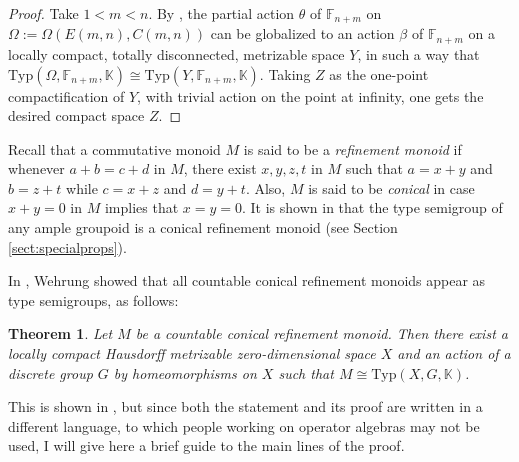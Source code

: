 \documentclass[11pt]{amsart}
\theoremstyle{plain}            %
\newtheorem{theorem}{Theorem}[section]
\theoremstyle{definition}       %
\theoremstyle{definition}       %
\theoremstyle{remark}
\newcommand{\Typ}{\mathrm{Typ}}
\begin{document}
\begin{proof}
Take $1<m<n$. By \cite[Corollary 7.9]{ae14}, the partial action $\theta$ of $\mathbb F_{n+m}$ on $\Omega:= \Omega (E(m,n),C(m,n))$ can be globalized to an action $\beta$ of $\mathbb F_{n+m}$
on a locally compact, totally disconnected, metrizable space $Y$, in such a way that $\Typ (\Omega, \mathbb F_{n+m},\mathbb K) \cong \Typ (Y, \mathbb F_{n+m},\mathbb K)$.
Taking $Z$ as the one-point compactification of $Y$, with trivial action on the point at infinity, one gets the desired compact space $Z$.
\end{proof}

Recall that a commutative monoid $M$ is said to be a {\it refinement monoid} if whenever $a+b=c+d$ in $M$, there exist $x,y,z,t$ in $M$ such that $a=x+y$ and $b=z+t$ while $c= x+z$ and $d= y+t$. 
Also, $M$ is said to be {\it conical} in case $x+y=0$ in $M$ implies that $x=y=0$. It is shown in \cite{weh} that the type semigroup of any ample groupoid is a conical refinement monoid (see Section \ref{sect:specialprops}).


In \cite{weh}, Wehrung showed that all countable conical refinement monoids appear as type semigroups, as follows:

\begin{theorem}{\rm{\cite{weh}}}
\label{thm:wehrung-realization}
Let $M$ be a countable conical refinement monoid. Then there exist a locally compact Hausdorff metrizable  zero-dimensional space $X$ and an action of a discrete group $G$ by homeomorphisms on $X$ such that $M\cong \Typ (X,G,\mathbb K)$.
\end{theorem}

This is shown in \cite[Theorem 4.8.9]{weh}, but since both the statement and its proof are written in a different language, to which people working on operator algebras may not be used, I will give here a brief guide to the main lines of the proof.
\end{document}
